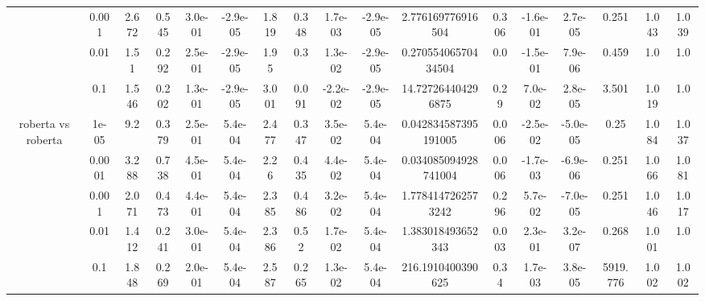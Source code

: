 \begin{tabular}{|c|c|c|c|c|c|c|c|c|c|c|c|c|c|c|c|c|}
 & 0.001 & 2.672 & 0.545 & 3.0e-01 & -2.9e-05 & 1.819 & 0.348 & 1.7e-03 & -2.9e-05 & 2.776169776916504 & 0.306 & -1.6e-01 & 2.7e-05 & 0.251 & 1.043 & 1.039 \\
 & 0.01 & 1.51 & 0.292 & 2.5e-01 & -2.9e-05 & 1.95 & 0.3 & 1.3e-02 & -2.9e-05 & 0.27055406570434504 & 0.0 & -1.5e-01 & 7.9e-06 & 0.459 & 1.0 & 1.0 \\
 & 0.1 & 1.546 & 0.202 & 1.3e-01 & -2.9e-05 & 3.001 & 0.091 & -2.2e-02 & -2.9e-05 & 14.727264404296875 & 0.29 & 7.0e-02 & 2.8e-05 & 3.501 & 1.019 & 1.0 \\
\hline
\multirow{5}{*}{roberta  vs roberta } & 1e-05 & 9.2 & 0.379 & 2.5e-01 & 5.4e-04 & 2.477 & 0.347 & 3.5e-02 & 5.4e-04 & 0.042834587395191005 & 0.006 & -2.5e-02 & -5.0e-05 & 0.25 & 1.084 & 1.037 \\
 & 0.0001 & 3.288 & 0.738 & 4.5e-01 & 5.4e-04 & 2.26 & 0.435 & 4.4e-02 & 5.4e-04 & 0.034085094928741004 & 0.006 & -1.7e-03 & -6.9e-06 & 0.251 & 1.066 & 1.081 \\
 & 0.001 & 2.071 & 0.473 & 4.4e-01 & 5.4e-04 & 2.385 & 0.486 & 3.2e-02 & 5.4e-04 & 1.7784147262573242 & 0.296 & 5.7e-02 & -7.0e-05 & 0.251 & 1.046 & 1.017 \\
 & 0.01 & 1.412 & 0.241 & 3.0e-01 & 5.4e-04 & 2.386 & 0.52 & 1.7e-02 & 5.4e-04 & 1.383018493652343 & 0.003 & 2.3e-01 & 3.2e-07 & 0.268 & 1.001 & 1.0 \\
 & 0.1 & 1.848 & 0.269 & 2.0e-01 & 5.4e-04 & 2.587 & 0.265 & 1.3e-02 & 5.4e-04 & 216.1910400390625 & 0.34 & 1.7e-03 & 3.8e-05 & 5919.776 & 1.002 & 1.002 \\
\hline
\end{tabular}